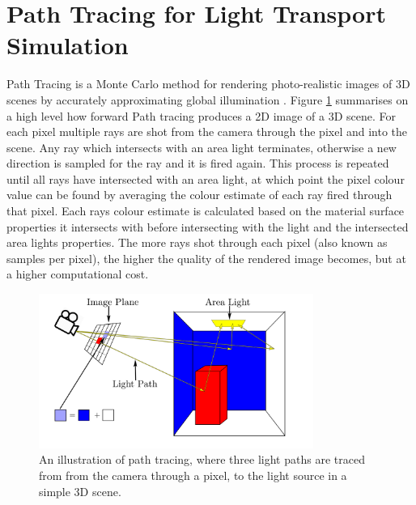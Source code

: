 \documentclass[ %
                    author={Callum Pearce},
                supervisor={Dr. Neill Campbell},
                    degree={MEng},
                     title={How effective are Temporal difference learning methods for reducing the number of zero contribution light paths, while still accurately approximating Global Illumination in Path tracing?},
                  subtitle={},
                      type={research},
                      year={2019} ]{dissertation}
\begin{document}
\section{Path Tracing for Light Transport Simulation}
\label{sec:conceptual_path_trace}
Path Tracing is a Monte Carlo method for rendering photo-realistic images of 3D 
scenes by accurately approximating global illumination \cite{christensen2016path}.
Figure \ref{fig:path_tracing_overview} summarises on a high level how forward Path tracing produces a 
2D image of a 3D scene. For each pixel multiple rays are shot from the camera through the 
pixel and into the scene. Any ray which intersects with an area light terminates, 
otherwise a new direction is sampled for the ray and it is fired again. This process 
is repeated until all rays have intersected with an area light, at which point the pixel 
colour value can  be found by averaging the colour estimate of each ray fired 
through that pixel. Each rays colour estimate is calculated based on the material 
surface properties it intersects with before intersecting with the light and the
intersected area lights properties. The more rays shot through each pixel (also 
known as samples per pixel), the higher the quality of the rendered image 
becomes, but at a higher computational cost.

\begin{figure}[h!]
\begin{center}
\includegraphics[width=0.8\textwidth]{images/path_tracing.png}    
\end{center}
\caption{An illustration of path tracing, where three light paths are traced from from the camera through a pixel, to the light source in a simple 3D scene.}
\label{fig:path_tracing_overview}
\end{figure}
\end{document}
